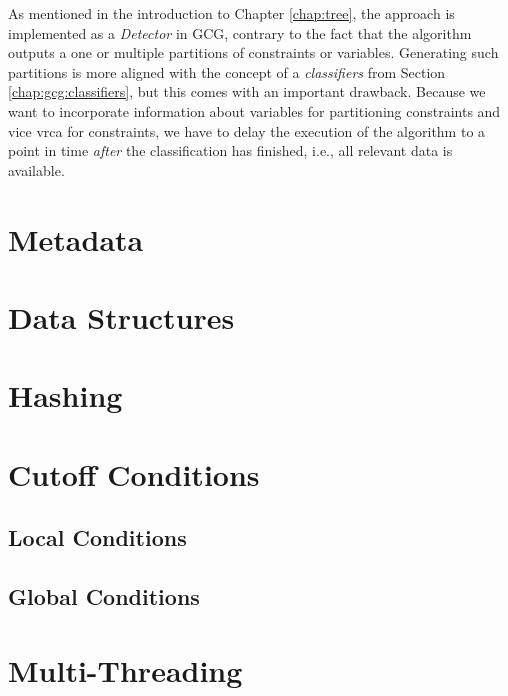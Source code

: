 		As mentioned in the introduction to Chapter \ref{chap:tree}, the approach is implemented as a \textit{Detector} in \ac{GCG}, contrary to the fact that the algorithm outputs a one or multiple partitions of constraints or variables.
		Generating such partitions is more aligned with the concept of a \textit{classifiers} from Section \ref{chap:gcg:classifiers}, but this comes with an important drawback.
		Because we want to incorporate information about variables for partitioning constraints and vice vrca for constraints, we have to delay the execution of the algorithm to a point in time \textit{after} the classification has finished, i.e., all relevant data is available.
	
	\section{Metadata}
	\label{chap:impl:meta}
	
	\section{Data Structures}
	\label{chap:impl:structures}
	
	
	\section{Hashing}
	\label{chap:impl:hashing}
	
	\section{Cutoff Conditions}
	\label{chap:impl:cutoff}
	
		\subsection{Local Conditions}
		
		\subsection{Global Conditions}
		
	
	\section{Multi-Threading}
	\label{chap:impl:multi}


